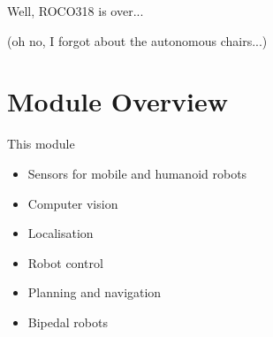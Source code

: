 \documentclass[compress]{beamer}
\begin{document}

\begin{frame}[plain]{}
    Well, ROCO318 is over...

    \pause
    (oh no, I forgot about the autonomous chairs...)
\end{frame}




\section{Module Overview}
\begin{frame}{This module}

\begin{itemize}
\item Sensors for mobile and humanoid robots
\item Computer vision
\item Localisation
\item Robot control
\item Planning and navigation
\item Bipedal robots
\end{itemize}

\end{frame}
\end{document}
